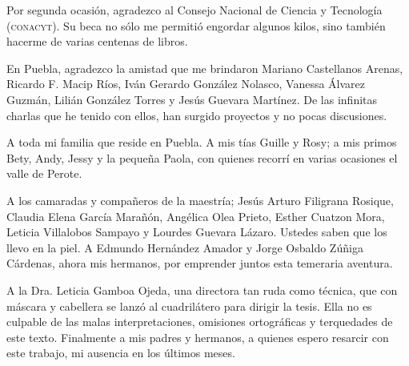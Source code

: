 \documentclass[14pt,twoside,final]{extbook} %
\providecommand\phantomsection{} %
\begin{document}
Por segunda ocasión, agradezco al Consejo Nacional de Ciencia y Tecnología (\textsc{conacyt}). Su beca no sólo me permitió engordar algunos kilos, sino también hacerme de varias centenas de libros.

En Puebla, agradezco la amistad que me brindaron Mariano Castellanos Arenas, Ricardo F. Macip Ríos, Iván Gerardo González Nolasco, Vanessa Álvarez Guzmán, Lilián González Torres y Jesús Guevara Martínez. De las infinitas charlas que he tenido con ellos, han surgido proyectos y no pocas discusiones.

A toda mi familia que reside en Puebla. A mis tías Guille y Rosy; a mis primos Bety, Andy, Jessy y la pequeña Paola, con quienes recorrí en varias ocasiones el valle de Perote.

A los camaradas y compañeros de la maestría; Jesús Arturo Filigrana Rosique, Claudia Elena García Marañón, Angélica Olea Prieto, Esther Cuatzon Mora, Leticia Villalobos Sampayo y Lourdes Guevara Lázaro. Ustedes saben que los llevo en la piel. A Edmundo Hernández Amador y Jorge Osbaldo Zúñiga Cárdenas, ahora mis hermanos, por emprender juntos esta temeraria aventura.

A la Dra. Leticia Gamboa Ojeda, una directora tan ruda como técnica, que con máscara y cabellera se lanzó al cuadrilátero para dirigir la tesis. Ella no es culpable de las malas interpretaciones, omisiones ortográficas y terquedades de este texto. Finalmente a mis padres y hermanos, a quienes espero resarcir con este trabajo, mi ausencia en los últimos meses.
\cleardoublepage
\makeatletter
\renewcommand\@dotsep{200} %
\makeatother
\renewcommand{\contentsname}{Índice de contenidos}
\thispagestyle{empty}
\pagestyle{fancy}
\fancyhf{} %
\fancyhead[RO,LE]{\thepage}
\fancyfoot{}
\renewcommand{\headrulewidth}{0pt}
\protect\phantomsection
{}
\tableofcontents
{}
\cleardoublepage
\makeatletter
\renewcommand\@dotsep{200} %
\makeatother
\renewcommand{\listtablename}{Índice de cuadros}
\listoftables
{}
\thispagestyle{empty}
\pagestyle{fancy}
\fancyhf{} %
\fancyhead[RO,LE]{\thepage}
\fancyfoot{}
\renewcommand{\headrulewidth}{0pt}
\makeatletter
\renewcommand\@dotsep{200} %
\makeatother
\renewcommand{\listfigurename}{Índice de imágenes}
\listoffigures
{}
\thispagestyle{empty}
\pagestyle{fancy}
\fancyhf{} %
\fancyhead[RO,LE]{\thepage}
\fancyfoot{}
\renewcommand{\headrulewidth}{0pt}
\end{document}
